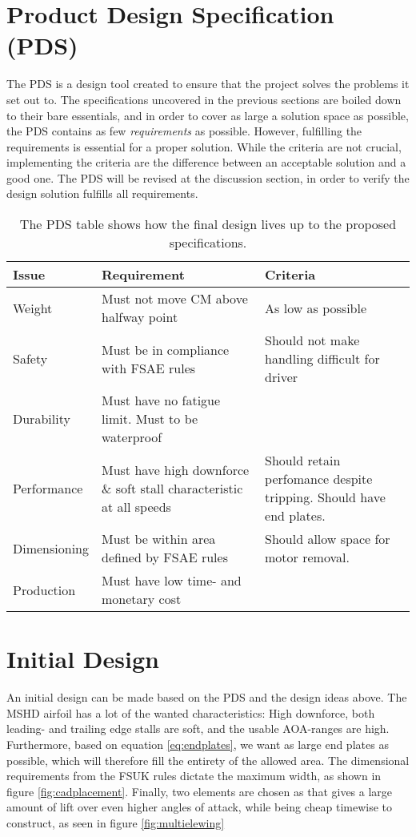\newpage
  \section{Product Design Specification (PDS)}
  \label{sec:PDS}

    The PDS is a design tool created to ensure that the project solves the problems it set out to. The specifications uncovered in the previous sections are boiled down to their bare essentials, and in order to cover as large a solution space as possible, the PDS contains as few \emph{requirements} as possible. However, fulfilling the requirements is essential for a proper solution. While the criteria are not crucial, implementing the criteria are the difference between an acceptable solution and a good one. The PDS will be revised at the discussion section, in order to verify the design solution fulfills all requirements.
    \begin{table}
      \begin{tabularx}{\textwidth}[t]{>{\columncolor{seapurple!40}}l XX}
      \arrayrulecolor{seapurple}\hline
      \rowcolor{white}
      \textbf{\textcolor{seapurple}{Issue}} & \textbf{\textcolor{seapurple}{Requirement}} & \textbf{\textcolor{seapurple}{Criteria}}\\
      \hline
      Weight & Must not move CM above halfway point & As low as possible \\
      Safety & Must be in compliance with FSAE rules & Should not make handling difficult for driver\\
      Durability & Must have no fatigue limit. Must to be waterproof & \\
      Performance & Must have high downforce \& soft stall characteristic at all speeds & Should retain perfomance despite tripping. Should have end plates.\\
      Dimensioning & Must be within area defined by FSAE rules & Should allow space for motor removal. \\
      Production & Must have low time- and monetary cost & \\
      \end{tabularx}
      \caption{The PDS table shows how the final design lives up to the proposed specifications.}
    \end{table}
  \section{Initial Design}

    An initial design can be made based on the PDS and the design ideas above. The MSHD airfoil has a lot of the wanted characteristics: High downforce, both leading- and trailing edge stalls are soft, and the usable AOA-ranges are high. Furthermore, based on equation \ref{eq:endplates}, we want as large end plates as possible, which will therefore fill the entirety of the allowed area. The dimensional requirements from the FSUK rules dictate the maximum width, as shown in figure \ref{fig:cadplacement}. Finally, two elements are chosen as that gives a large amount of lift over even higher angles of attack, while being cheap timewise to construct, as seen in figure \ref{fig:multielewing}

